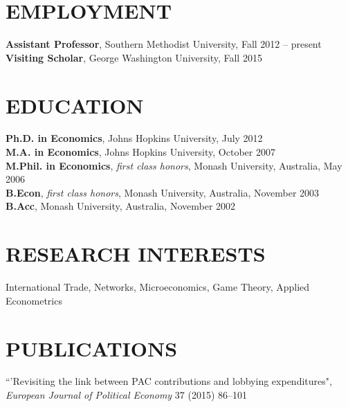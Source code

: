 \documentclass[11pt]{res}
\begin{document}
\begin{resume}
\hspace{-0.5in}\makebox[6.1in]{\hrulefill}

\section{EMPLOYMENT} \vspace{1.5mm}
{\bf Assistant Professor}, Southern Methodist University, Fall 2012 -- present\vspace{.5mm}\\
{\bf Visiting Scholar}, George Washington University, Fall 2015


\section{EDUCATION} \vspace{1.5mm}
    {\bf Ph.D. in Economics}, Johns Hopkins University, July 2012 \vspace{.5mm}\\
    {\bf M.A. in Economics}, Johns Hopkins University, October 2007\vspace{1.5mm}\\
    {\bf M.Phil. in Economics}, \emph{first class honors}, Monash University, Australia, May 2006\vspace{1.5mm}\\
    {\bf B.Econ}, \emph{first class honors}, Monash University, Australia, November 2003\vspace{1.5mm}\\
    {\bf B.Acc}, Monash University, Australia, November 2002


\section{RESEARCH INTERESTS}\vspace{1.5mm}
International Trade, Networks, Microeconomics, Game Theory, Applied Econometrics

\section{PUBLICATIONS}\vspace{1.5mm}
{``'Revisiting the link between PAC contributions and lobbying expenditures", \emph{European Journal of Political Economy}} 37 (2015) 86--101 \vspace{1.5mm}


\end{resume}
\end{document}
